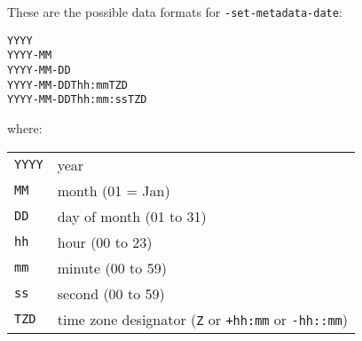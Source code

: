 \documentclass{book}
\begin{document}
These are the possible data formats for \texttt{-set-metadata-date}:

\begin{verbatim}
YYYY
YYYY-MM
YYYY-MM-DD
YYYY-MM-DDThh:mmTZD
YYYY-MM-DDThh:mm:ssTZD
\end{verbatim}

\noindent where:

\medskip
\begin{tabular}{ll}
\texttt{YYYY} & year \\
\texttt{MM} & month (01 = Jan)\\
\texttt{DD} & day of month (01 to 31)\\
\texttt{hh} & hour (00 to 23)\\
\texttt{mm} & minute (00 to 59)\\
\texttt{ss} & second (00 to 59)\\
\texttt{TZD} & time zone designator (\texttt{Z} or \texttt{+hh:mm} or \texttt{-hh::mm})
\end{tabular}
\pagestyle{fancy}


\backmatter
\pagestyle{fancy}

\printindex
\end{document}
